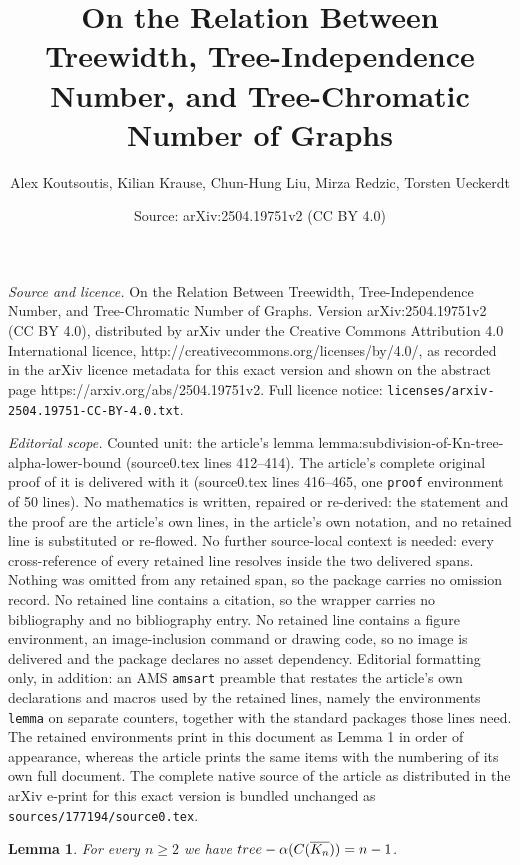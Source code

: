\documentclass[10pt,a4paper]{amsart}
\title{On the Relation Between Treewidth, Tree-Independence Number, and Tree-Chromatic Number of Graphs}
\author{Alex Koutsoutis, Kilian Krause, Chun-Hung Liu, Mirza Redzic, Torsten Ueckerdt}
\date{Source: arXiv:2504.19751v2 (CC BY 4.0)}
\newtheorem{lemma}{Lemma}
\newcommand{\treea}{{\rm tree}\textnormal{-}\alpha}
\begin{document}
\maketitle

\noindent\emph{Source and licence.} On the Relation Between Treewidth, Tree-Independence Number, and Tree-Chromatic Number of Graphs. Version arXiv:2504.19751v2 (CC BY 4.0), distributed by arXiv under the Creative Commons Attribution 4.0 International licence, http://creativecommons.org/licenses/by/4.0/, as recorded in the arXiv licence metadata for this exact version and shown on the abstract page https://arxiv.org/abs/2504.19751v2. Full licence notice: \texttt{licenses/arxiv-2504.19751-CC-BY-4.0.txt}.\par\smallskip

\noindent\textit{Editorial scope.} Counted unit: the article's lemma lemma:subdivision-of-Kn-tree-alpha-lower-bound (source0.tex lines 412--414). The article's complete original proof of it is delivered with it (source0.tex lines 416--465, one \texttt{proof} environment of 50 lines). No mathematics is written, repaired or re-derived: the statement and the proof are the article's own lines, in the article's own notation, and no retained line is substituted or re-flowed.  No further source-local context is needed: every cross-reference of every retained line resolves inside the two delivered spans.  Nothing was omitted from any retained span, so the package carries no omission record.  No retained line contains a citation, so the wrapper carries no bibliography and no bibliography entry.  No retained line contains a figure environment, an image-inclusion command or drawing code, so no image is delivered and the package declares no asset dependency.  Editorial formatting only, in addition: an AMS \texttt{amsart} preamble that restates the article's own declarations and macros used by the retained lines, namely the environments \texttt{lemma} on separate counters, together with the standard packages those lines need.  The retained environments print in this document as Lemma 1 in order of appearance, whereas the article prints the same items with the numbering of its own full document.  The complete native source of the article as distributed in the arXiv e-print for this exact version is bundled unchanged as \texttt{sources/177194/source0.tex}.
\begin{lemma}\label{lemma:subdivision-of-Kn-tree-alpha-lower-bound}
    For every $n \geq 2$ we have $\treea(C(\overline{K_n})) = n-1$. %
\end{lemma}
\end{document}
